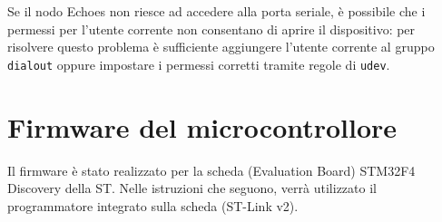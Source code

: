 \begin{nota}
Se il nodo Echoes non riesce ad accedere alla porta seriale, è possibile che i permessi per l'utente corrente non consentano di aprire il dispositivo: per risolvere questo problema è sufficiente aggiungere l'utente corrente al gruppo \verb|dialout| oppure impostare i permessi corretti tramite regole di \verb|udev|.
\end{nota}

\section{Firmware del microcontrollore}

Il firmware è stato realizzato per la scheda (Evaluation Board) STM32F4 Discovery della ST. Nelle istruzioni che seguono, verrà utilizzato il programmatore integrato sulla scheda (ST-Link v2).


